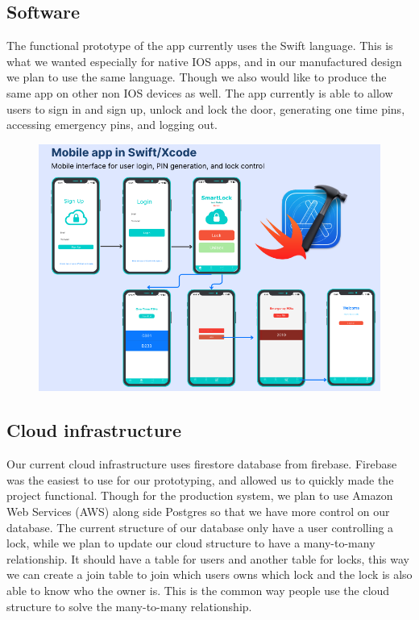 \subsection{Software}

The functional prototype of the app currently uses the Swift language. This is what we wanted especially for native IOS apps, and in our manufactured design we plan to use the same language. Though we also would like to produce the same app on other non IOS devices as well. The app currently is able to allow users to sign in and sign up, unlock and lock the door, generating one time pins, accessing emergency pins, and logging out. 

\begin{figure}[!ht]
    \centering
    \includegraphics[width=1\textwidth]{img/softwareComponents.png}
    \label{fig:softwareComponents}
\end{figure}

\subsection{Cloud infrastructure}

Our current cloud infrastructure uses firestore database from firebase. Firebase was the easiest to use for our prototyping, and allowed us to quickly made the project functional. Though for the production system, we plan to use Amazon Web Services (AWS) along side Postgres so that we have more control on our database.  The current structure of our database only have a user controlling a lock, while we plan to update our cloud structure to have a many-to-many relationship. It should have a table for users and another table for locks, this way we can create a join table to join which users owns which lock and the lock is also able to know who the owner is. This is the common way people use the cloud structure to solve the many-to-many relationship.

